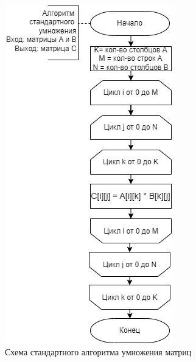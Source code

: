\documentclass[a4paper,14pt, unknownkeysallowed]{extreport}
\begin{document}
\begin{figure}[h!]
	\centering
	\includegraphics[scale=0.95]{img/std_mul.png}
	\caption{Схема стандартного алгоритма умножения матриц}
	\label{fig:std_mul}
\end{figure}

\clearpage
\end{document}
